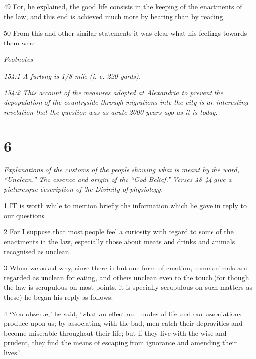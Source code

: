 \par 49 For, he explained, the good life consists in the keeping of the enactments of the law, and this end is achieved much more by hearing than by reading.

\par 50 From this and other similar statements it was clear what his feelings towards them were.

\par \textit{Footnotes}

\par \textit{154:1 A furlong is 1/8 mile (i. e. 220 yards).}

\par \textit{154:2 This account of the measures adopted at Alexandria to prevent the depopulation of the countryside through migrations into the city is an interesting revelation that the question was as acute 2000 years ago as it is today.}

\chapter{6}

\par \textit{Explanations of the customs of the people showing what is meant by the word, “Unclean.” The essence and origin of the “God-Belief.” Verses 48-44 give a picturesque description of the Divinity of physiology.}

\par 1 IT is worth while to mention briefly the information which he gave in reply to our questions.

\par 2 For I suppose that most people feel a curiosity with regard to some of the enactments in the law, especially those about meats and drinks and animals recognised as unclean.

\par 3 When we asked why, since there is but one form of creation, some animals are regarded as unclean for eating, and others unclean even to the touch (for though the law is scrupulous on most points, it is specially scrupulous on such matters as these) he began his reply as follows:

\par 4 ‘You observe,’ he said, ‘what an effect our modes of life and our associations produce upon us; by associating with the bad, men catch their depravities and become miserable throughout their life; but if they live with the wise and prudent, they find the means of escaping from ignorance and amending their lives.’

